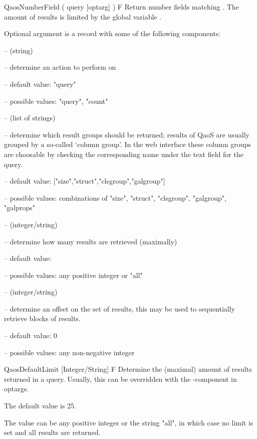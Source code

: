 \> QaosNumberField ( query [optarg] ) F
  Return number fields matching .
The amount of results is limited by the global variable .

Optional argument  is a record with some of the following
components:
\beginlist
\item{--}  (string)
  \beginlist
  \item{--} determine an action to perform on 
  \item{--} default value: "query"
  \item{--} possible values: "query", "count"
  \endlist

\item{--}  (list of strings)
  \beginlist
  \item{--} determine which result groups should be returned; results of QaoS are
  usually grouped by a so-called `column group'.  In the web interface these
  column groups are choosable by checking the corresponding name under the text
  field for the query.
  \item{--} default value: ["size","struct","clsgroup","galgroup"]
  \item{--} possible values:
  combinations of "size", "struct", "clsgroup", "galgroup", "galprops"
  \endlist

\item{--}  (integer/string)
  \beginlist
  \item{--} determine how many results are retrieved (maximally)
  \item{--} default value: 
  \item{--} possible values: any positive integer or "all"
  \endlist

\item{--}  (integer/string)
  \beginlist
  \item{--} determine an offset on the set of results, this may be used to
  sequentially retrieve blocks of results.
  \item{--} default value: 0
  \item{--} possible values: any non-negative integer
  \endlist
\endlist


\> QaosDefaultLimit [Integer/String] F
  Determine the (maximal) amount of results returned in a query.
Usually, this can be overridden with the -component in optargs.

The default value is 25.

The value can be any positive integer or the string "all", in which case no
limit is set and all results are returned.

